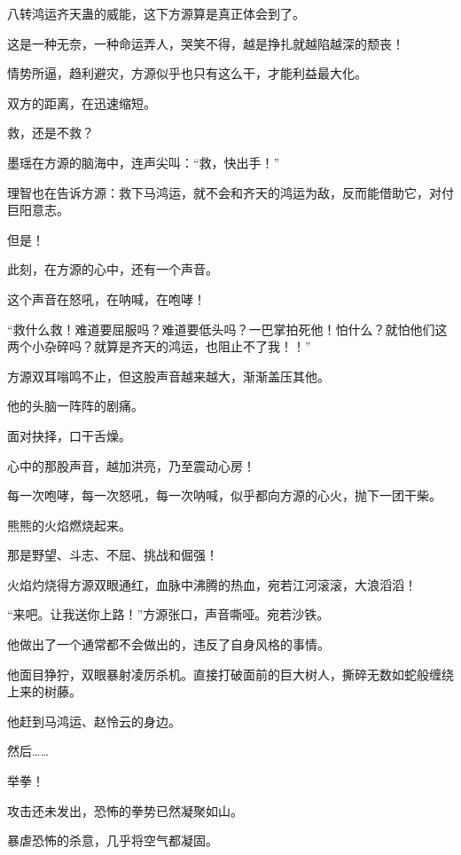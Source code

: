 
\begin{this_body}



八转鸿运齐天蛊的威能，这下方源算是真正体会到了。

这是一种无奈，一种命运弄人，哭笑不得，越是挣扎就越陷越深的颓丧！

情势所逼，趋利避灾，方源似乎也只有这么干，才能利益最大化。

双方的距离，在迅速缩短。

救，还是不救？

墨瑶在方源的脑海中，连声尖叫：“救，快出手！”

理智也在告诉方源：救下马鸿运，就不会和齐天的鸿运为敌，反而能借助它，对付巨阳意志。

但是！

此刻，在方源的心中，还有一个声音。

这个声音在怒吼，在呐喊，在咆哮！

“救什么救！难道要屈服吗？难道要低头吗？一巴掌拍死他！怕什么？就怕他们这两个小杂碎吗？就算是齐天的鸿运，也阻止不了我！！”

方源双耳嗡鸣不止，但这股声音越来越大，渐渐盖压其他。

他的头脑一阵阵的剧痛。

面对抉择，口干舌燥。

心中的那股声音，越加洪亮，乃至震动心房！

每一次咆哮，每一次怒吼，每一次呐喊，似乎都向方源的心火，抛下一团干柴。

熊熊的火焰燃烧起来。

那是野望、斗志、不屈、挑战和倔强！

火焰灼烧得方源双眼通红，血脉中沸腾的热血，宛若江河滚滚，大浪滔滔！

“来吧。让我送你上路！”方源张口，声音嘶哑。宛若沙铁。

他做出了一个通常都不会做出的，违反了自身风格的事情。

他面目狰狞，双眼暴射凌厉杀机。直接打破面前的巨大树人，撕碎无数如蛇般缠绕上来的树藤。

他赶到马鸿运、赵怜云的身边。

然后……

举拳！

攻击还未发出，恐怖的拳势已然凝聚如山。

暴虐恐怖的杀意，几乎将空气都凝固。


\end{this_body}
